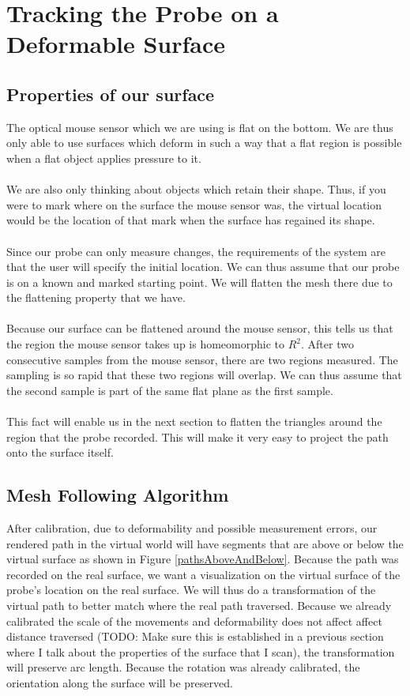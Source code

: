 \section{Tracking the Probe on a Deformable Surface}

\subsection{Properties of our surface}

The optical mouse sensor which we are using is flat on the bottom. We are thus only able to use surfaces which deform in such a way that a flat region is possible when a flat object applies pressure to it. \\
\\
We are also only thinking about objects which retain their shape. Thus, if you were to mark where on the surface the mouse sensor was, the virtual location would be the location of that mark when the surface has regained its shape. \\
\\
Since our probe can only measure changes, the requirements of the system are that the user will specify the initial location. We can thus assume that our probe is on a known and marked starting point. We will flatten the mesh there due to the flattening property that we have. \\
\\
Because our surface can be flattened around the mouse sensor, this tells us that the region the mouse sensor takes up is homeomorphic to $R^2$. After two consecutive samples from the mouse sensor, there are two regions measured. The sampling is so rapid that these two regions will overlap. We can thus assume that the second sample is part of the same flat plane as the first sample. \\
\\
This fact will enable us in the next section to flatten the triangles around the region that the probe recorded. This will make it very easy to project the path onto the surface itself. 

\subsection{Mesh Following Algorithm}

After calibration, due to deformability and possible measurement errors, our rendered path in the virtual world will have segments that are above or below the virtual surface as shown in Figure \ref{pathsAboveAndBelow}. Because the path was recorded on the real surface, we want a visualization on the virtual surface of the probe's location on the real surface. We will thus do a transformation of the virtual path to better match where the real path traversed. Because we already calibrated the scale of the movements and deformability does not affect affect distance traversed (TODO: Make sure this is established in a previous section where I talk about the properties of the surface that I scan), the transformation will preserve arc length. Because the rotation was already calibrated, the orientation along the surface will be preserved.

